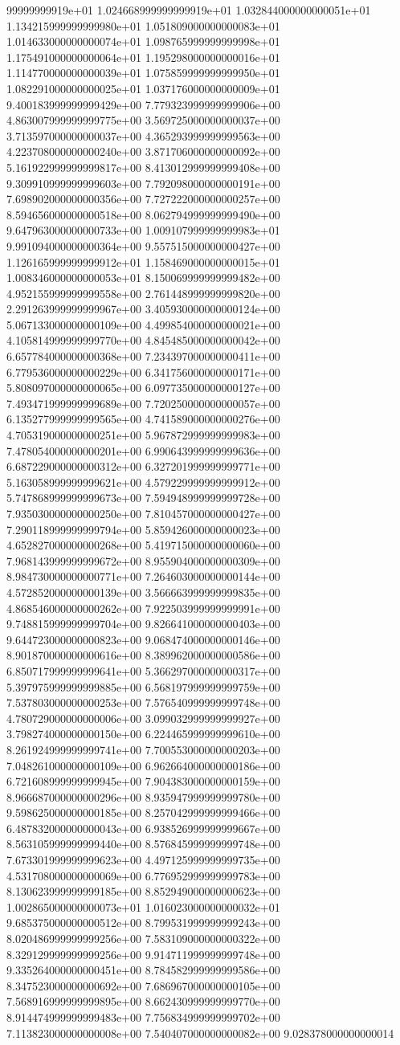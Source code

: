 99999999919e+01	1.024668999999999919e+01	1.032844000000000051e+01	1.134215999999999980e+01	1.051809000000000083e+01	1.014633000000000074e+01	1.098765999999999998e+01	1.175491000000000064e+01	1.195298000000000016e+01	1.114770000000000039e+01	1.075859999999999950e+01	1.082291000000000025e+01	1.037176000000000009e+01	9.400183999999999429e+00	7.779323999999999906e+00	4.863007999999999775e+00	3.569725000000000037e+00	3.713597000000000037e+00	4.365293999999999563e+00	4.223708000000000240e+00	3.871706000000000092e+00	5.161922999999999817e+00	8.413012999999999408e+00	9.309910999999999603e+00	7.792098000000000191e+00	7.698902000000000356e+00	7.727222000000000257e+00	8.594656000000000518e+00	8.062794999999999490e+00	9.647963000000000733e+00	1.009107999999999983e+01	9.991094000000000364e+00	9.557515000000000427e+00	1.126165999999999912e+01	1.158469000000000015e+01	1.008346000000000053e+01	8.150069999999999482e+00	4.952155999999999558e+00	2.761448999999999820e+00	2.291263999999999967e+00	3.405930000000000124e+00	5.067133000000000109e+00	4.499854000000000021e+00	4.105814999999999770e+00	4.845485000000000042e+00	6.657784000000000368e+00	7.234397000000000411e+00	6.779536000000000229e+00	6.341756000000000171e+00	5.808097000000000065e+00	6.097735000000000127e+00	7.493471999999999689e+00	7.720250000000000057e+00	6.135277999999999565e+00	4.741589000000000276e+00	4.705319000000000251e+00	5.967872999999999983e+00	7.478054000000000201e+00	6.990643999999999636e+00	6.687229000000000312e+00	6.327201999999999771e+00	5.163058999999999621e+00	4.579229999999999912e+00	5.747868999999999673e+00	7.594948999999999728e+00	7.935030000000000250e+00	7.810457000000000427e+00	7.290118999999999794e+00	5.859426000000000023e+00	4.652827000000000268e+00	5.419715000000000060e+00	7.968143999999999672e+00	8.955904000000000309e+00	8.984730000000000771e+00	7.264603000000000144e+00	4.572852000000000139e+00	3.566663999999999835e+00	4.868546000000000262e+00	7.922503999999999991e+00	9.748815999999999704e+00	9.826641000000000403e+00	9.644723000000000823e+00	9.068474000000000146e+00	8.901870000000000616e+00	8.389962000000000586e+00	6.850717999999999641e+00	5.366297000000000317e+00	5.397975999999999885e+00	6.568197999999999759e+00	7.537803000000000253e+00	7.576540999999999748e+00	4.780729000000000006e+00	3.099032999999999927e+00	3.798274000000000150e+00	6.224465999999999610e+00	8.261924999999999741e+00	7.700553000000000203e+00	7.048261000000000109e+00	6.962664000000000186e+00	6.721608999999999945e+00	7.904383000000000159e+00	8.966687000000000296e+00	8.935947999999999780e+00	9.598625000000000185e+00	8.257042999999999466e+00	6.487832000000000043e+00	6.938526999999999667e+00	8.563105999999999440e+00	8.576845999999999748e+00	7.673301999999999623e+00	4.497125999999999735e+00	4.531708000000000069e+00	6.776952999999999783e+00	8.130623999999999185e+00	8.852949000000000623e+00	1.002865000000000073e+01	1.016023000000000032e+01	9.685375000000000512e+00	8.799531999999999243e+00	8.020486999999999256e+00	7.583109000000000322e+00	8.329129999999999256e+00	9.914711999999999748e+00	9.335264000000000451e+00	8.784582999999999586e+00	8.347523000000000692e+00	7.686967000000000105e+00	7.568916999999999895e+00	8.662430999999999770e+00	8.914474999999999483e+00	7.756834999999999702e+00	7.113823000000000008e+00	7.540407000000000082e+00	9.028378000000000014